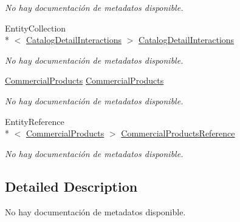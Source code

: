 \begin{DoxyCompactItemize}
\begin{DoxyCompactList}\small\item\em No hay documentación de metadatos disponible. \end{DoxyCompactList}\item 
Entity\-Collection\\*
$<$ \hyperlink{class_game_memory_1_1_catalog_detail_interactions}{Catalog\-Detail\-Interactions} $>$ \hyperlink{class_game_memory_1_1_catalog_details_a19559e5bdd71c8487f22b4d9ad15822e}{Catalog\-Detail\-Interactions}
\begin{DoxyCompactList}\small\item\em No hay documentación de metadatos disponible. \end{DoxyCompactList}\item 
\hyperlink{class_game_memory_1_1_commercial_products}{Commercial\-Products} \hyperlink{class_game_memory_1_1_catalog_details_a569b5d7f57651aa9658a60e55bf0ca35}{Commercial\-Products}
\begin{DoxyCompactList}\small\item\em No hay documentación de metadatos disponible. \end{DoxyCompactList}\item 
Entity\-Reference\\*
$<$ \hyperlink{class_game_memory_1_1_commercial_products}{Commercial\-Products} $>$ \hyperlink{class_game_memory_1_1_catalog_details_a012479cf343ddfd153da97312c957877}{Commercial\-Products\-Reference}
\begin{DoxyCompactList}\small\item\em No hay documentación de metadatos disponible. \end{DoxyCompactList}\end{DoxyCompactItemize}


\subsection{Detailed Description}
No hay documentación de metadatos disponible. 



